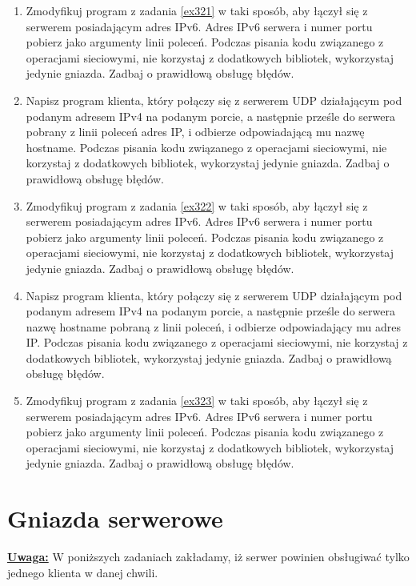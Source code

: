 \documentclass{article}
\begin{document}
\begin{enumerate}[label=\textbf{3.\arabic*}, resume]
\item  Zmodyfikuj program z zadania \ref{ex321} w taki sposób,  aby łączył się z serwerem posiadającym adres IPv6. Adres IPv6 serwera i numer portu pobierz jako argumenty linii poleceń. Podczas pisania kodu związanego z operacjami sieciowymi, nie korzystaj z dodatkowych bibliotek, wykorzystaj jedynie gniazda. Zadbaj o prawidłową obsługę błędów. 

\item \label{ex322} Napisz program klienta, który połączy się z serwerem UDP działającym pod podanym adresem IPv4 na podanym porcie, a następnie prześle do serwera pobrany z linii poleceń adres IP, i odbierze odpowiadającą mu nazwę hostname. Podczas pisania kodu związanego z operacjami sieciowymi, nie korzystaj z dodatkowych bibliotek, wykorzystaj jedynie gniazda. Zadbaj o prawidłową obsługę błędów. 

\item  Zmodyfikuj program z zadania \ref{ex322} w taki sposób,  aby łączył się z serwerem posiadającym adres IPv6. Adres IPv6 serwera i numer portu pobierz jako argumenty linii poleceń. Podczas pisania kodu związanego z operacjami sieciowymi, nie korzystaj z dodatkowych bibliotek, wykorzystaj jedynie gniazda. Zadbaj o prawidłową obsługę błędów. 

\item \label{ex323} Napisz program klienta, który połączy się z serwerem UDP działającym pod podanym adresem IPv4 na podanym porcie, a następnie prześle do serwera nazwę hostname pobraną z linii poleceń, i odbierze odpowiadający mu adres IP.  Podczas pisania kodu związanego z operacjami sieciowymi, nie korzystaj z dodatkowych bibliotek, wykorzystaj jedynie gniazda. Zadbaj o prawidłową obsługę błędów. 

\item Zmodyfikuj program z zadania \ref{ex323} w taki sposób,  aby łączył się z serwerem posiadającym adres IPv6. Adres IPv6 serwera i numer portu pobierz jako argumenty linii poleceń. Podczas pisania kodu związanego z operacjami sieciowymi, nie korzystaj z dodatkowych bibliotek, wykorzystaj jedynie gniazda. Zadbaj o prawidłową obsługę błędów. 
\end{enumerate}


\newpage
\section{Gniazda serwerowe}


\noindent \textbf{\underline{Uwaga:}} W poniższych zadaniach zakładamy, iż serwer powinien obsługiwać tylko jednego klienta w danej chwili.
\end{document}
